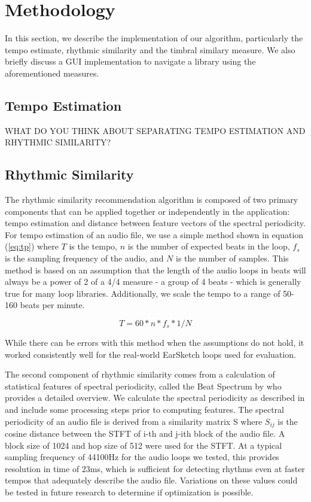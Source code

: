 \documentclass{article}
\begin{document}
\section{Methodology}

In this section, we describe the implementation of our algorithm, particularly the tempo estimate, rhythmic similarity and the timbral similary measure. We also briefly discuss a GUI implementation to navigate a library using the aforementioned measures.

\subsection{Tempo Estimation}
WHAT DO YOU THINK ABOUT SEPARATING TEMPO ESTIMATION AND RHYTHMIC SIMILARITY?


\subsection{Rhythmic Similarity}

The rhythmic similarity recommendation algorithm is composed of two primary components that can be applied together or independently in the application: tempo estimation and distance between feature vectors of the spectral periodicity. For tempo estimation of an audio file, we use a simple method shown in equation (\ref{eq:tp}) where \(T\) is the tempo, \(n\) is the number of expected beats in the loop, \(f_s\) is the sampling frequency of the audio, and \(N\) is the number of samples. This method is based on an assumption that the length of the audio loops in beats will always be a power of 2 of a 4/4 measure - a group of 4 beats - which is generally true for many loop libraries. Additionally, we scale the tempo to a range of 50-160 beats per minute.

\begin{equation}
\label{eq:tp}
T = 60 * n * f_s * 1/N
\end{equation}

While there can be errors with this method when the assumptions do not hold, it worked consistently well for the real-world EarSketch \cite{earsketch} loops used for evaluation.

The second component of rhythmic similarity comes from a calculation of statistical features of spectral periodicity, called the Beat Spectrum by \cite{foote2001beat} who provides a detailed overview. We calculate the spectral periodicity as described in \cite{foote2001beat} and include some processing steps prior to computing features. The spectral periodicity of an audio file is derived from a similarity matrix S where \(S_{ij}\) is the cosine distance between the STFT of i-th and j-ith block of the audio file. A block size of 1024 and hop size of 512 were used for the STFT. At a typical sampling frequency of 44100Hz for the audio loops we tested, this provides resolution in time of 23ms, which is sufficient for detecting rhythms even at faster tempos that adequately describe the audio file. Variations on these values could be tested in future research to determine if optimization is possible.
\end{document}
